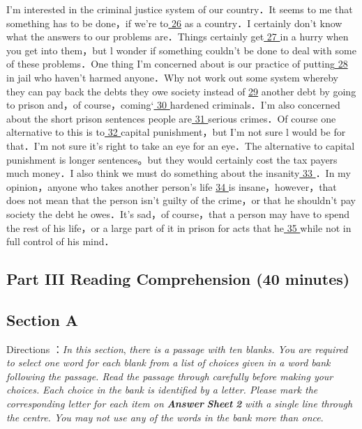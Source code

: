 \documentclass[UTF8,11pt]{ctexart}
\begin{document}
I'm interested in the criminal justice system of our country．It seems to me that something has to be done，if we’re to\uline{ 26} as a country．I certainly don’t know what the answers to our problems are．Things certainly get\uline{ 27 }in a hurry when you get into them，but l wonder if something couldn’t be done to deal with some of these problems．One thing I'm concerned about is our practice of putting\uline{ 28} in jail who haven’t harmed anyone．Why not work out some system whereby they can pay back the debts they owe society instead of \uline{29} another debt by going to prison and，of course，coming‘\uline{ 30 }hardened criminals．I'm also concerned about the short prison sentences people are\uline{ 31 }serious crimes．Of course one alternative to this is to\uline{ 32 }capital punishment，but I'm not sure l would be for that．I'm not sure it’s right to take an eye for an eye．The alternative to capital punishment is longer sentences。but they would certainly cost the tax payers much money．I also think we must do something about the insanity\uline{ 33 }．In my opinion，anyone who takes another person’s life \uline{34 }is insane，however，that does not mean that the person isn’t guilty of the crime，or that he shouldn’t pay society the debt he owes．It’s sad，of course，that a person may have to spend the rest of his life，or a large part of it in prison for acts that he\uline{ 35 }while not in full control of his mind．


\subsection*{\textbf{Part} III \textbf{Reading Comprehension} \textbf{(40 minutes)}}


\subsection*{\textbf{Section A}}


Directions ：\textit{In this section},\textit{ there is a passage with ten blanks. You are required to select one word for each blank from a list} \textit{of choices given in a word bank following the passage. Read the passage through carefully before making your choices.} \textit{Each choice in the bank is identified by a letter. Please mark the corresponding letter for each item on}\textbf{\textit{ Answer}} \textbf{\textit{Sheet}} \textbf{\textit{2}}\textit{ with} \textit{a single line through the centre. You may not use any of the words in the bank more than once}.
\end{document}
